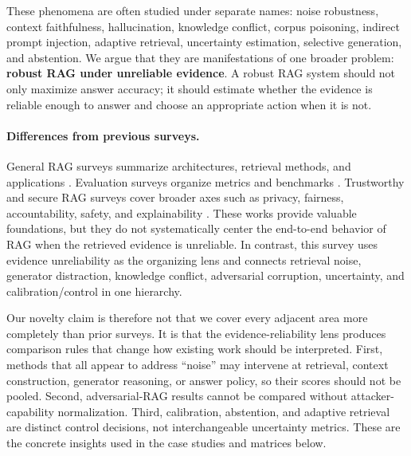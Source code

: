 \documentclass[11pt]{article}
\begin{document}
These phenomena are often studied under separate names: noise robustness, context faithfulness, hallucination, knowledge conflict, corpus poisoning, indirect prompt injection, adaptive retrieval, uncertainty estimation, selective generation, and abstention. We argue that they are manifestations of one broader problem: \textbf{robust RAG under unreliable evidence}. A robust RAG system should not only maximize answer accuracy; it should estimate whether the evidence is reliable enough to answer and choose an appropriate action when it is not.

\paragraph{Differences from previous surveys.}
General RAG surveys summarize architectures, retrieval methods, and applications \citep{ragSurvey2024,ragComprehensive2025}. Evaluation surveys organize metrics and benchmarks \citep{ragEvaluationSurvey2024}. Trustworthy and secure RAG surveys cover broader axes such as privacy, fairness, accountability, safety, and explainability \citep{trustRAGCompass2024,trustworthyRAGSurvey2025,securityRAGSurvey2026}. These works provide valuable foundations, but they do not systematically center the end-to-end behavior of RAG when the retrieved evidence is unreliable. In contrast, this survey uses evidence unreliability as the organizing lens and connects retrieval noise, generator distraction, knowledge conflict, adversarial corruption, uncertainty, and calibration/control in one hierarchy.





Our novelty claim is therefore not that we cover every adjacent area more completely than prior surveys. It is that the evidence-reliability lens produces comparison rules that change how existing work should be interpreted. First, methods that all appear to address ``noise'' may intervene at retrieval, context construction, generator reasoning, or answer policy, so their scores should not be pooled. Second, adversarial-RAG results cannot be compared without attacker-capability normalization. Third, calibration, abstention, and adaptive retrieval are distinct control decisions, not interchangeable uncertainty metrics. These are the concrete insights used in the case studies and matrices below.
\end{document}
